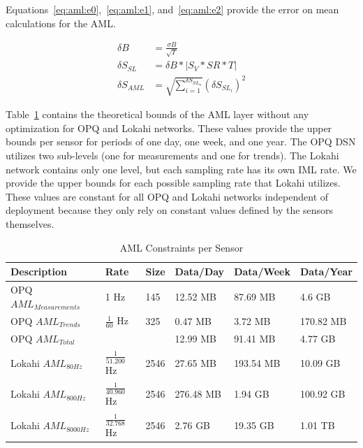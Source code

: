 Equations~\ref{eq:aml:e0},~\ref{eq:aml:e1}, and~\ref{eq:aml:e2} provide the error on mean calculations for the AML\@.

\begin{align}
	\delta B &= \frac{\sigma B}{\sqrt{T}} \label{eq:aml:e0} \\
	\delta S_{SL} &= \delta B * |S_{V} * SR * T| \label{eq:aml:e1} \\
	\delta S_{AML} &= \sqrt{\sum_{i=1}^{\delta S_{SL_{n}}}} (\delta S_{SL_{i}}) ^ 2  \label{eq:aml:e2}
\end{align}

Table~\ref{table:aml_size} contains the theoretical bounds of the AML layer without any optimization for OPQ and Lokahi networks. These values provide the upper bounds per sensor for periods of one day, one week, and one year. The OPQ DSN utilizes two sub-levels (one for measurements and one for trends). The Lokahi network contains only one level, but each sampling rate has its own IML rate. We provide the upper bounds for each possible sampling rate that Lokahi utilizes. These values are constant for all OPQ and Lokahi networks independent of deployment because they only rely on constant values defined by the sensors themselves.

\begin{table}[H]
	\centering
	\caption{AML Constraints per Sensor}
	\begin{tabularx}{\textwidth}{Xlllll}
		\toprule
		\textbf{Description} & \textbf{Rate} & \textbf{Size} & \textbf{Data/Day} & \textbf{Data/Week} & \textbf{Data/Year} \\
		\midrule
		OPQ $AML_{Measurements}$ 	& 1 Hz 					& 145 			& 12.52 MB 	& 87.69 MB 	& 4.6 GB 	\\
		OPQ $AML_{Trends}$ 			& $\frac{1}{60}$ Hz 	& 325 			& 0.47 MB 	& 3.72 MB  	& 170.82 MB \\
		OPQ $AML_{Total}$ 			&   					&   			& 12.99 MB 	& 91.41 MB 	& 4.77 GB 	\\
		Lokahi $AML_{80Hz}$			& $\frac{1}{51.200}$ Hz	& 2546  		& 27.65 MB 	& 193.54 MB & 10.09 GB	\\
		Lokahi $AML_{800Hz}$		& $\frac{1}{40.960}$ Hz	& 2546		& 276.48 MB & 1.94 GB 	& 100.92 GB \\
		Lokahi $AML_{8000Hz}$		& $\frac{1}{32.768}$ Hz	& 2546		& 2.76 GB 	& 19.35 GB 	& 1.01 TB 	\\
		\bottomrule
	\end{tabularx}
	\label{table:aml_size}
\end{table}

